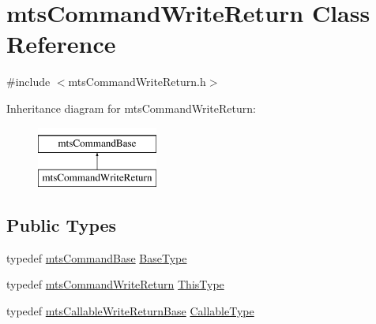 \hypertarget{classmts_command_write_return}{}\section{mts\+Command\+Write\+Return Class Reference}
\label{classmts_command_write_return}


{\ttfamily \#include $<$mts\+Command\+Write\+Return.\+h$>$}

Inheritance diagram for mts\+Command\+Write\+Return\+:\begin{figure}[H]
\begin{center}
\leavevmode
\includegraphics[height=2.000000cm]{d0/d0d/classmts_command_write_return}
\end{center}
\end{figure}
\subsection*{Public Types}
\begin{DoxyCompactItemize}
\item 
typedef \hyperlink{classmts_command_base}{mts\+Command\+Base} \hyperlink{classmts_command_write_return_a77f6a3a0512f7914b99f53dfe307a798}{Base\+Type}
\item 
typedef \hyperlink{classmts_command_write_return}{mts\+Command\+Write\+Return} \hyperlink{classmts_command_write_return_a134ad936dafcef1c96fb73c9a2ff8a8d}{This\+Type}
\item 
typedef \hyperlink{classmts_callable_write_return_base}{mts\+Callable\+Write\+Return\+Base} \hyperlink{classmts_command_write_return_ac99dff53e64c78801540f606bb3b701b}{Callable\+Type}
\end{DoxyCompactItemize}
